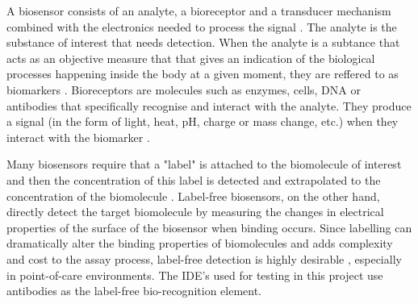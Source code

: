 A biosensor consists of an analyte, a bioreceptor and a transducer mechanism combined with the electronics needed to process the signal \cite{bhallaIntroductionBiosensors2016}. The analyte is the substance of interest that needs detection. When the analyte is a subtance that acts as an objective measure that that gives an indication of the biological processes happening inside the body at a given moment, they are reffered to as biomarkers \cite{BiomarkersNationalInstitute}. Bioreceptors are molecules such as enzymes, cells, DNA or antibodies that specifically recognise and interact with the analyte. They produce a signal (in the form of light, heat, pH, charge or mass change, etc.) when they interact with the biomarker \cite{bhallaIntroductionBiosensors2016}. 

Many biosensors require that a "label" is attached to the biomolecule of interest and then the concentration of this label is detected and extrapolated to the concentration of the biomolecule \cite{danielsLabelFreeImpedanceBiosensors2007}. Label-free biosensors, on the other hand, directly detect the target biomolecule by measuring the changes in electrical properties of the surface of the biosensor when binding occurs. Since labelling can dramatically alter the binding properties of biomolecules and adds complexity and cost to the assay process, label-free detection is highly desirable \cite{danielsLabelFreeImpedanceBiosensors2007}, especially in point-of-care environments. The IDE's used for testing in this project use antibodies as the label-free bio-recognition element.

